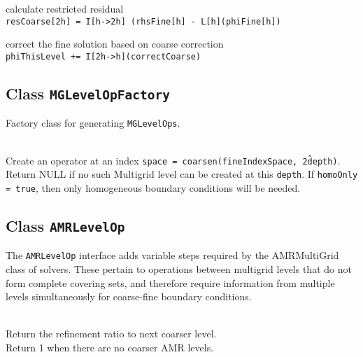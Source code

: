 \begin{itemize}
\begin{itemize}
\begin{itemize}
\begin{itemize}
\begin{itemize}
\begin{itemize}
\begin{itemize}
\begin{itemize}
\begin{itemize}
 calculate restricted residual \\
{\tt resCoarse[2h] = I[h->2h] (rhsFine[h] - L[h](phiFine[h])}

 correct the fine solution based on coarse correction \\
{\tt phiThisLevel += I[2h->h](correctCoarse)}

\ei

\subsection{Class {\tt MGLevelOpFactory}}

Factory class for generating {\tt MGLevelOps}.

\begin{itemize}

 \\
Create an operator at an index {\tt space = coarsen(fineIndexSpace,
                                2\^ depth)}. 
Return NULL if no such Multigrid level can be created at this {\tt depth}.
If {\tt homoOnly = true}, then only homogeneous boundary conditions
                                will be needed.

\ei



\subsection{Class {\tt AMRLevelOp}}

The {\tt AMRLevelOp} interface adds variable steps required by the AMRMultiGrid class of solvers. 
These pertain to operations between multigrid levels that do not form complete covering sets, 
and therefore require information from multiple levels simultaneously
for coarse-fine boundary conditions.     

\begin{itemize}

\\     Return the refinement ratio to next coarser level.
\\     Return 1 when there are no coarser AMR levels.



\end{itemize}
\end{itemize}
\end{itemize}
\end{itemize}
\end{itemize}
\end{itemize}
\end{itemize}
\end{itemize}
\end{itemize}
\end{itemize}
\end{itemize}
